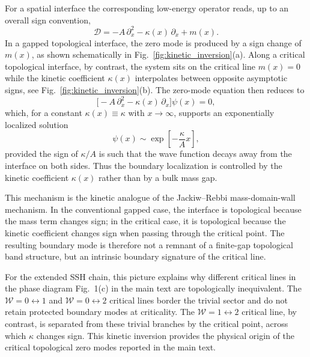 \documentclass[aps,prl,twocolumn,preprintnumbers,amsmath,amssymb,superscriptaddress,10pt]{revtex4-2}
\begin{document}
For a spatial interface the corresponding low-energy operator reads,
up to an overall sign convention,
\begin{equation}
\mathcal{D}
=
-A\,\partial_x^2-\kappa(x)\,\partial_x+m(x).
\label{eq:SM_kinetic_operator}
\end{equation}
In a gapped topological interface, the zero mode is produced by a sign
change of $m(x)$, as shown schematically in
Fig.~\ref{fig:kinetic_inversion}(a). Along a critical topological
interface, by contrast, the system sits on the critical line $m(x)=0$
while the kinetic coefficient $\kappa(x)$ interpolates between
opposite asymptotic signs, see Fig.~\ref{fig:kinetic_inversion}(b). The zero-mode equation then
reduces to
\begin{equation}
\bigl[-A\,\partial_x^2
      -\kappa(x)\,\partial_x\bigr]\psi(x)=0 ,
\label{eq:SM_zero_mode_kinetic}
\end{equation}
which, for a constant $\kappa(x)\equiv \kappa$ with $x\rightarrow \infty$, supports an exponentially localized solution
\begin{equation}
\psi(x)\sim
\exp\!\left[-\frac{\kappa}{A} x\right],
\label{eq:SM_kinetic_zero_mode}
\end{equation}
provided the sign of $\kappa/A$ is such that the wave function decays away from the interface on both sides. Thus the boundary localization is controlled by the kinetic coefficient $\kappa(x)$ rather than by a bulk mass gap.

This mechanism is the kinetic analogue of the Jackiw--Rebbi mass-domain-wall mechanism. In the conventional gapped case, the interface is topological because the mass term changes sign; in the critical case, it is topological because the kinetic coefficient
changes sign when passing through the critical point. The resulting boundary mode is therefore not a remnant of a finite-gap topological band structure, but an intrinsic boundary signature of the critical line. 

For the extended SSH chain, this picture explains why different critical lines in the phase diagram Fig.~1(c) in the main text are topologically inequivalent. The $\mathcal{W}=0\leftrightarrow1$ and $\mathcal{W}=0\leftrightarrow2$ critical lines border the trivial sector and do not retain protected boundary modes at criticality. The $\mathcal{W}=1\leftrightarrow2$ critical line, by contrast, is separated from these trivial branches by the critical point, across which $\kappa$ changes sign. This kinetic inversion provides the physical origin of the critical topological zero modes reported in the main text.
\end{document}
